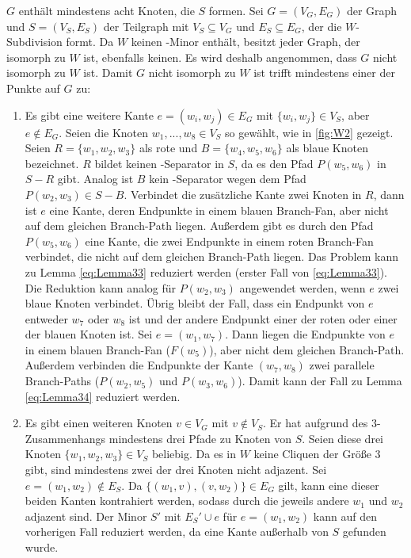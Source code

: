 \begin{beweis}
  $G$ enthält mindestens acht Knoten, die $S$ formen.
  Sei $G = (V_G, E_G)$ der Graph und $S = (V_S, E_S)$ der Teilgraph mit $V_S \subseteq V_G$ und $E_S \subseteq E_G$, der die $W$-Subdivision formt.
  Da $W$ keinen \kf-Minor enthält, besitzt jeder Graph, der isomorph zu $W$ ist, ebenfalls keinen.
  Es wird deshalb angenommen, dass $G$ nicht isomorph zu $W$ ist.
  Damit $G$ nicht isomorph zu $W$ ist trifft mindestens einer der Punkte auf $G$ zu:
  \begin{enumerate}
    \item Es gibt eine weitere Kante $e = (w_i, w_j) \in E_G$ mit $\{w_i, w_j\} \in V_S$, aber $e \notin E_G$.
    Seien die Knoten $w_1, ..., w_8 \in V_S$ \oBdA so gewählt, wie in \Abb \ref{fig:W2} gezeigt.
    Seien $R = \{w_1, w_2, w_3\}$ als rote und $B = \{w_4, w_5, w_6\}$ als blaue Knoten bezeichnet.
    $R$ bildet keinen \dd-Separator in $S$, da es den Pfad $P(w_5, w_6)$ in $S - R$ gibt.
    Analog ist $B$ kein \dd-Separator wegen dem Pfad $P(w_2, w_3) \in S - B$.
    Verbindet die zusätzliche Kante zwei Knoten in $R$, dann ist $e$ eine Kante, deren Endpunkte in einem blauen Branch-Fan, aber nicht auf dem gleichen Branch-Path liegen.
    Außerdem gibt es durch den Pfad $P(w_5, w_6)$ eine Kante, die zwei Endpunkte in einem roten Branch-Fan verbindet, die nicht auf dem gleichen Branch-Path liegen.
    Das Problem kann zu Lemma \ref{eq:Lemma33} reduziert werden (erster Fall von \ref{eq:Lemma33}).
    Die Reduktion kann analog für $P(w_2, w_3)$ angewendet werden, wenn $e$ zwei blaue Knoten verbindet.
    Übrig bleibt der Fall, dass ein Endpunkt von $e$ entweder $w_7$ oder $w_8$ ist und der andere Endpunkt einer der roten oder einer der blauen Knoten ist.
    Sei \oBdA $e = (w_1, w_7)$.
    Dann liegen die Endpunkte von $e$ in einem blauen Branch-Fan ($F(w_5)$), aber nicht dem gleichen Branch-Path.
    Außerdem verbinden die Endpunkte der Kante $(w_7, w_8)$ zwei parallele Branch-Paths ($P(w_2, w_5)$ und $P(w_3, w_6)$).
    Damit kann der Fall zu Lemma \ref{eq:Lemma34} reduziert werden.
    \item Es gibt einen weiteren Knoten $v \in V_G$ mit $v \notin V_S$.
    Er hat aufgrund des $3$-Zusammenhangs mindestens drei Pfade zu Knoten von $S$.
    Seien diese drei Knoten $\{w_1, w_2, w_3\} \in V_S$ beliebig.
    Da es in $W$ keine Cliquen der Größe $3$ gibt, sind mindestens zwei der drei Knoten nicht adjazent.
    Sei \oBdA $e = (w_1, w_2) \notin E_S$.
    Da $\{(w_1, v), (v, w_2)\} \in E_G$ gilt, kann eine dieser beiden Kanten kontrahiert werden, sodass durch die jeweils andere $w_1$ und $w_2$ adjazent sind.
    Der Minor $S'$ mit $E_S' \cup e$ für $e = (w_1, w_2)$ kann auf den vorherigen Fall reduziert werden, da eine Kante außerhalb von $S$ gefunden wurde.
  \end{enumerate}
\end{beweis}

